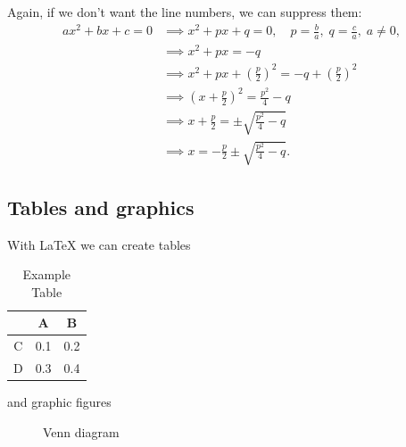 \documentclass{article}[12pt]
\begin{document}
        Again, if we don't want the line numbers, we can suppress them:
        \begin{align*}
            a x^2 + b x + c = 0
            & \implies x^2 + p x + q = 0,
            \quad p = \frac{b}{a}, \; q = \frac{c}{a}, \; a \ne 0,
            \\
            & \implies x^2 + p x = -q
            \\
            & \implies x^2 + p x + \left(\frac{p}{2}\right)^2
            = -q + \left(\frac{p}{2}\right)^2
            \\
            & \implies \left( x + \frac{p}{2} \right)^2
            = \frac{p^2}{4} - q
            \\
            & \implies x + \frac{p}{2}
            = \pm \sqrt{ \frac{p^2}{4} - q }
            \\
            & \implies x
            = -\frac{p}{2} \pm \sqrt{ \frac{p^2}{4} - q }.
        \end{align*}
    
    \subsection{Tables and graphics}
        
        With LaTeX we can create tables
        \begin{table}[H] %
            \centering
            \begin{tabular}{|c||c|c|} %
                \hline %
                   & A   & B \\
                 \hline\hline %
                 C & 0.1 & 0.2 \\
                 \hline
                 D & 0.3 & 0.4 \\
                 \hline %
            \end{tabular}
            \caption{Example Table} %
        \end{table}
        
        and graphic figures
        \begin{figure}[H] %
            \centering
            \caption{Venn diagram}
        \end{figure}
        
\end{document}
